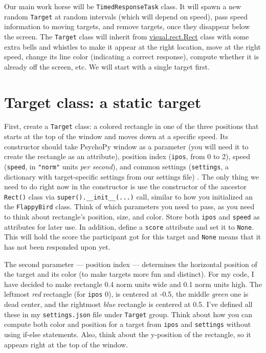 \documentclass[
]{book}
\begin{document}
Our main work horse will be \texttt{TimedResponseTask} class. It will spawn a new random \texttt{Target} at random intervals (which will depend on speed), pass speed information to moving targets, and remove targets, once they disappear below the screen. The \texttt{Target} class will inherit from \href{https://psychopy.org/api/visual/rect.html\#psychopy.visual.rect.Rect}{visual.rect.Rect} class with some extra bells and whistles to make it appear at the right location, move at the right speed, change its line color (indicating a correct response), compute whether it is already off the screen, etc. We will start with a single target first.

\hypertarget{target-class-a-static-target}{%
\section{Target class: a static target}\label{target-class-a-static-target}}

First, create a \texttt{Target} class: a colored rectangle in one of the three positions that starts at the top of the window and moves down at a specific speed. Its constructor should take PsychoPy window as a parameter (you will need it to create the rectangle as an attribute), position index (\texttt{ipos}, from 0 to 2), speed (\texttt{speed}, in \texttt{"norm"} units \emph{per second}), and common settings (\texttt{settings}, a dictionary with target-specific settings from our settings file) . The only thing we need to do right now in the constructor is use the constructor of the ancestor \texttt{Rect()} class via \texttt{super().\_\_init\_\_(...)} call, similar to how you initialized an the \texttt{FlappyBird} class. Think of which parameters you need to pass, as you need to think about rectangle's position, size, and color. Store both \texttt{ipos} and \texttt{speed} as attributes for later use. In addition, define a \texttt{score} attribute and set it to \texttt{None}. This will hold the score the participant got for this target and \texttt{None} means that it has not been responded upon yet.

The second parameter --- position index --- determines the horizontal position of the target and its color (to make targets more fun and distinct). For my code, I have decided to make rectangle 0.4 norm units wide and 0.1 norm units high. The leftmost \emph{red} rectangle (for \texttt{ipos} 0), is centered at -0.5, the middle \emph{green} one is dead center, and the rightmost \emph{blue} rectangle is centered at 0.5. I've defined all these in my \texttt{settings.json} file under \texttt{Target} group. Think about how you can compute both color and position for a target from \texttt{ipos} and \texttt{settings} without using if-else statements. Also, think about the y-position of the rectangle, so it appears right at the top of the window.
\end{document}
